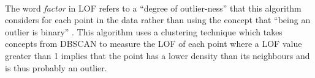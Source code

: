 \paragraph{ }The word \textit{factor} in \acs{LOF} refers to a ``degree of outlier-ness'' that this algorithm considers for each point in the data rather than using the concept that ``being an outlier is binary'' \cite{Breunig2000}. This algorithm uses a clustering technique which takes concepts from \acs{DBSCAN} to measure the \acs{LOF} of each point where a \acs{LOF} value greater than 1 implies that the point has a lower density than its neighbours and is thus probably an outlier.